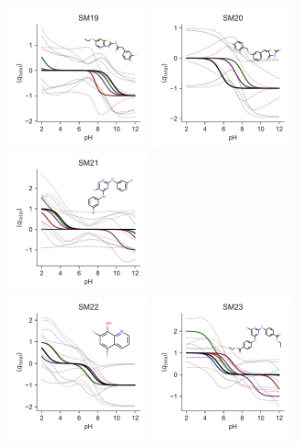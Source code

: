 \documentclass[9pt,lineno,final]{elife}
\begin{document}
 \begin{figure}[hbt]	
	\centering
	\includegraphics[width=0.33\textwidth]{Reports/overview-SM19-titration-bootstrap-molecule.pdf}
	\includegraphics[width=0.33\textwidth]{Reports/overview-SM20-titration-bootstrap-molecule.pdf}
	\includegraphics[width=0.33\textwidth]{Reports/overview-SM21-titration-bootstrap-molecule.pdf}	 \\
	\includegraphics[width=0.33\textwidth]{Reports/overview-SM22-titration-bootstrap-molecule.pdf}
	\includegraphics[width=0.33\textwidth]{Reports/overview-SM23-titration-bootstrap-molecule.pdf}

\end{figure}
\end{document}
